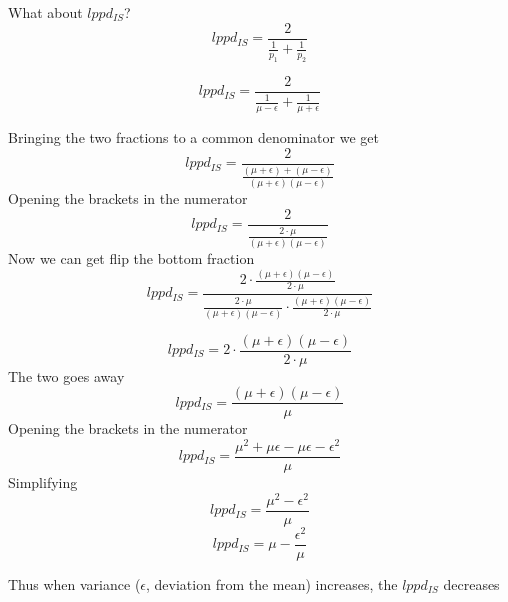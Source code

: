 \documentclass[
]{book}
\begin{document}
What about \(lppd_{IS}\)?
\[lppd_{IS} = \frac{2}{\frac{1}{p_1} + \frac{1}{p_2}}\]

\[lppd_{IS} = \frac{2}{\frac{1}{\mu - \epsilon} + \frac{1}{\mu + \epsilon}}\]

Bringing the two fractions to a common denominator we get
\[lppd_{IS} = \frac{2}{\frac{(\mu + \epsilon) + (\mu - \epsilon)}{(\mu + \epsilon)(\mu - \epsilon)}}\]
Opening the brackets in the numerator
\[lppd_{IS} = \frac{2}{\frac{2 \cdot \mu }{(\mu + \epsilon)(\mu - \epsilon)}}\]
Now we can get flip the bottom fraction
\[lppd_{IS} = \frac{2 \cdot \frac{(\mu + \epsilon)(\mu - \epsilon)}{2 \cdot \mu}}{\frac{2 \cdot \mu }{(\mu + \epsilon)(\mu - \epsilon)} \cdot \frac{(\mu + \epsilon)(\mu - \epsilon)}{2 \cdot \mu}} \]

\[lppd_{IS} = 2 \cdot \frac{(\mu + \epsilon)(\mu - \epsilon)}{2 \cdot \mu}\]
The two goes away
\[lppd_{IS} = \frac{(\mu + \epsilon)(\mu - \epsilon)}{\mu}\]
Opening the brackets in the numerator
\[lppd_{IS} = \frac{\mu^2 + \mu\epsilon - \mu\epsilon - \epsilon^2}{\mu}\]
Simplifying
\[lppd_{IS} = \frac{\mu^2 - \epsilon^2}{\mu}\]
\[lppd_{IS} = \mu - \frac{\epsilon^2}{\mu}\]

Thus when variance (\(\epsilon\), deviation from the mean) increases, the \(lppd_{IS}\) decreases
\end{document}
